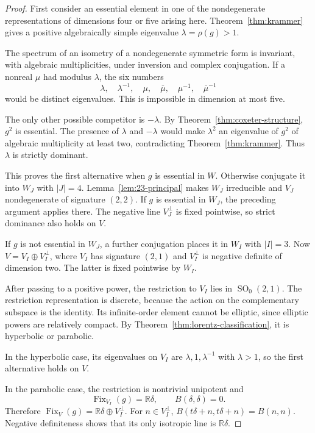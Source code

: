 \documentclass[11pt,reqno]{amsart}
\newcommand{\R}{\mathbb{R}}
\theoremstyle{plain}
\theoremstyle{definition}
\theoremstyle{remark}
\numberwithin{equation}{section}
\begin{document}
\begin{proof}
First consider an essential element in one of the nondegenerate representations of dimensions four or five arising here. Theorem~\ref{thm:krammer} gives a positive algebraically simple eigenvalue $\lambda=\rho(g)>1$.

The spectrum of an isometry of a nondegenerate symmetric form is invariant, with algebraic multiplicities, under inversion and complex conjugation. If a nonreal $\mu$ had modulus $\lambda$, the six numbers
\[
\lambda,\quad\lambda^{-1},\quad\mu,\quad\overline\mu,\quad
\mu^{-1},\quad\overline\mu^{-1}
\]
would be distinct eigenvalues. This is impossible in dimension at most five.

The only other possible competitor is $-\lambda$. By Theorem~\ref{thm:coxeter-structure}, $g^2$ is essential. The presence of $\lambda$ and $-\lambda$ would make $\lambda^2$ an eigenvalue of $g^2$ of algebraic multiplicity at least two, contradicting Theorem~\ref{thm:krammer}. Thus $\lambda$ is strictly dominant.

This proves the first alternative when $g$ is essential in $W$. Otherwise conjugate it into $W_J$ with $|J|=4$. Lemma~\ref{lem:23-principal} makes $W_J$ irreducible and $V_J$ nondegenerate of signature $(2,2)$. If $g$ is essential in $W_J$, the preceding argument applies there. The negative line $V_J^\perp$ is fixed pointwise, so strict dominance also holds on $V$.

If $g$ is not essential in $W_J$, a further conjugation places it in $W_I$ with $|I|=3$. Now $V=V_I\oplus V_I^\perp$, where $V_I$ has signature $(2,1)$ and $V_I^\perp$ is negative definite of dimension two. The latter is fixed pointwise by $W_I$.

After passing to a positive power, the restriction to $V_I$ lies in $\operatorname{SO}_0(2,1)$. The restriction representation is discrete, because the action on the complementary subspace is the identity. Its infinite-order element cannot be elliptic, since elliptic powers are relatively compact. By Theorem~\ref{thm:lorentz-classification}, it is hyperbolic or parabolic.

In the hyperbolic case, its eigenvalues on $V_I$ are $\lambda,1,\lambda^{-1}$ with $\lambda>1$, so the first alternative holds on $V$.

In the parabolic case, the restriction is nontrivial unipotent and
\[
\operatorname{Fix}_{V_I}(g)=\R\delta,\qquad B(\delta,\delta)=0.
\]
Therefore $\operatorname{Fix}_V(g)=\R\delta\oplus V_I^\perp$. For $n\in V_I^\perp$, $B(t\delta+n,t\delta+n)=B(n,n)$. Negative definiteness shows that its only isotropic line is $\R\delta$.
\end{proof}
\end{document}
